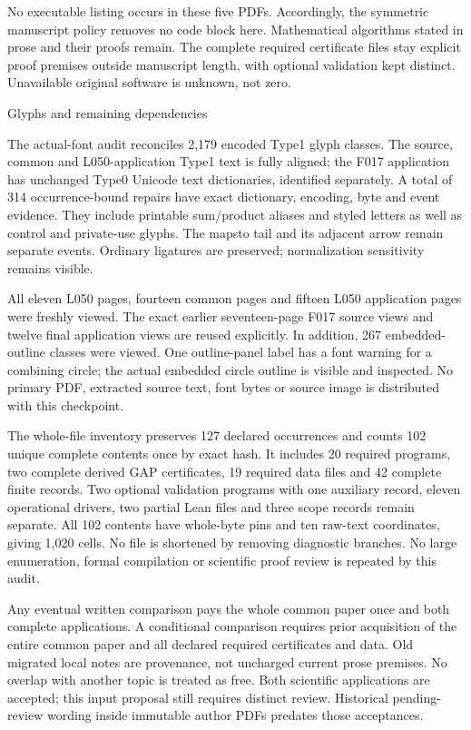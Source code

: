 \documentclass[11pt]{article}
\begin{document}
No executable listing occurs in these five PDFs. Accordingly, the symmetric
manuscript policy removes no code block here. Mathematical algorithms stated
in prose and their proofs remain. The complete required certificate files stay
explicit proof premises outside manuscript length, with optional validation
kept distinct. Unavailable original software is unknown, not zero.

\newpage
\begin{center}\Large Glyphs and remaining dependencies\end{center}

The actual-font audit reconciles 2,179 encoded Type1 glyph classes. The source, common
and L050-application Type1 text is fully aligned; the F017 application has
unchanged Type0 Unicode text dictionaries, identified separately. A total of
314 occurrence-bound repairs have exact dictionary, encoding, byte and event
evidence. They include printable sum/product aliases and styled letters as
well as control and private-use glyphs. The mapsto tail and its adjacent arrow
remain separate events. Ordinary ligatures are preserved; normalization
sensitivity remains visible.

All eleven L050 pages, fourteen common pages and fifteen L050 application pages
were freshly viewed. The exact
earlier seventeen-page F017 source views and twelve final application views are
reused explicitly. In addition, 267 embedded-outline classes were viewed. One
outline-panel label has a font warning for a combining circle; the actual
embedded circle outline is visible and inspected. No primary PDF, extracted
source text, font bytes or source image is distributed with this checkpoint.

The whole-file inventory preserves 127 declared occurrences and counts 102
unique complete contents once by exact hash. It includes 20 required programs,
two complete derived GAP certificates, 19 required data files and 42 complete
finite records. Two optional validation programs with one auxiliary record,
eleven operational drivers, two partial Lean files and three scope records
remain separate. All 102 contents have whole-byte pins and ten raw-text
coordinates, giving 1,020 cells. No file is shortened by removing diagnostic
branches. No large enumeration, formal compilation or scientific proof review
is repeated by this audit.

Any eventual written comparison pays the whole common paper once and both
complete applications. A conditional comparison requires prior acquisition
of the entire common paper and all declared required certificates and data.
Old migrated local notes are provenance, not uncharged current prose premises.
No overlap with another topic is treated as free. Both scientific applications
are accepted; this input proposal still requires distinct review. Historical
pending-review wording inside immutable author PDFs predates those acceptances.
\end{document}
